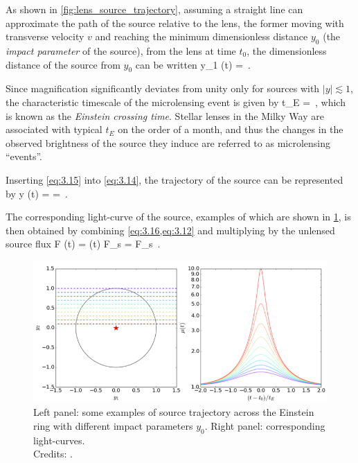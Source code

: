 As shown in \cref{fig:lens_source_trajectory}, assuming a straight line can approximate the path of the source relative to the lens, the former moving with transverse velocity $v$ and reaching the minimum dimensionless distance $y_0$ (\ie the \emph{impact parameter} of the source), from the lens at time $t_0$, the dimensionless distance of the source from $y_0$ can be written
\be
\label{eq:3.14}
y_1 (t) =  \,.
\ee

Since magnification significantly deviates from unity only for sources with $|y| \lesssim 1$, the characteristic timescale of the microlensing event is given by
\be
\label{eq:3.15}
t_E =  \,,
\ee
which is known as the \emph{Einstein crossing time}. Stellar lenses in the Milky Way are associated with typical $t_E$ on the order of a month, and thus the changes in the observed brightness of the source they induce are referred to as microlensing ``events''.

Inserting \cref{eq:3.15} into \cref{eq:3.14}, the trajectory of the source can be represented by
\be
\label{eq:3.16}
y (t) =  =   \,.
\ee

The corresponding light-curve of the source, examples of which are shown in \cref{fig:light_curves}, is then obtained by combining \cref{eq:3.16,eq:3.12} and multiplying by the unlensed source flux
\be
\label{eq:3.17}
F (t) = \m (t) F_s =  F_s  \,.
\ee

\begin{figure}
    \centering
    \includegraphics[width=\linewidth, keepaspectratio]{img//chapter3/light_curves.png}
    \caption[Microlensing light-curves for different impact parameters]{Left panel: some examples of source trajectory across the Einstein ring with different impact parameters $y_0$. Right panel: corresponding light-curves.\\\small{Credits: \cite{meneghetti_introduction_2021}.}}
    \label{fig:light_curves}
\end{figure}

